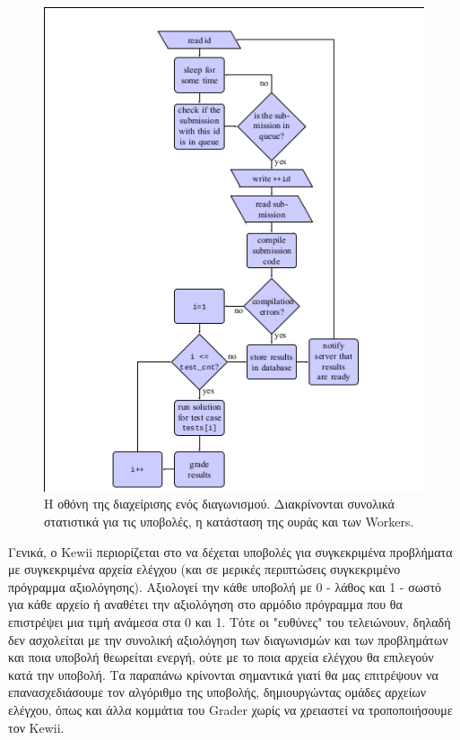 \documentclass[diploma]{softlab-thesis}
\begin{document}
\begin{figure}
  \centering
  \includegraphics[scale=0.3,trim=4 4 4 4,clip]{Figures/graderflow.png}
  \caption[Οθόνη διαχείρισης προβλήματος]{Η οθόνη της διαχείρισης ενός διαγωνισμού.
  Διακρίνονται συνολικά στατιστικά για τις υποβολές, η κατάσταση της ουράς και των
  Workers.}
\end{figure}

\bigskip

Γενικά, ο Kewii περιορίζεται στο να δέχεται υποβολές για συγκεκριμένα προβλήματα
με συγκεκριμένα αρχεία ελέγχου (και σε μερικές περιπτώσεις συγκεκριμένο πρόγραμμα
αξιολόγησης). Αξιολογεί την κάθε υποβολή με 0 - λάθος και 1 - σωστό για κάθε αρχείο
ή αναθέτει την αξιολόγηση στο αρμόδιο πρόγραμμα που θα επιστρέψει μια τιμή ανάμεσα
στα 0 και 1. Τότε οι "ευθύνες" του τελειώνουν, δηλαδή δεν ασχολείται με την συνολική
αξιολόγηση των διαγωνισμών και των προβλημάτων και ποια υποβολή θεωρείται ενεργή,
ούτε με το ποια αρχεία ελέγχου θα επιλεγούν κατά την υποβολή. Τα παραπάνω κρίνονται
σημαντικά γιατί θα μας επιτρέψουν να επανασχεδιάσουμε τον αλγόριθμο της υποβολής,
δημιουργώντας ομάδες αρχείων ελέγχου, όπως και άλλα κομμάτια του Grader χωρίς να
χρειαστεί να τροποποιήσουμε τον Kewii.
\end{document}
